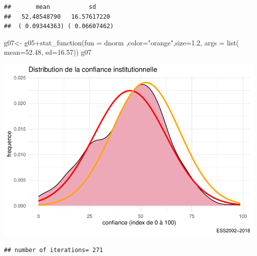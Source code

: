 \documentclass[
]{book}
\newenvironment{Shaded}{\begin{snugshade}}{\end{snugshade}}
\newcommand{\AttributeTok}[1]{\textcolor[rgb]{0.77,0.63,0.00}{#1}}
\newcommand{\DecValTok}[1]{\textcolor[rgb]{0.00,0.00,0.81}{#1}}
\newcommand{\FloatTok}[1]{\textcolor[rgb]{0.00,0.00,0.81}{#1}}
\newcommand{\FunctionTok}[1]{\textcolor[rgb]{0.00,0.00,0.00}{#1}}
\newcommand{\NormalTok}[1]{#1}
\newcommand{\OtherTok}[1]{\textcolor[rgb]{0.56,0.35,0.01}{#1}}
\newcommand{\SpecialCharTok}[1]{\textcolor[rgb]{0.00,0.00,0.00}{#1}}
\newcommand{\StringTok}[1]{\textcolor[rgb]{0.31,0.60,0.02}{#1}}
\begin{document}
\begin{verbatim}
##       mean           sd     
##   52.48548790   16.57617220 
##  ( 0.09344363) ( 0.06607462)
\end{verbatim}

\begin{Shaded}
\begin{Highlighting}[]
\NormalTok{g07}\OtherTok{\textless{}{-}}\NormalTok{ g05}\SpecialCharTok{+}\FunctionTok{stat\_function}\NormalTok{(}\AttributeTok{fun =}\NormalTok{  dnorm ,}\AttributeTok{color=}\StringTok{"orange"}\NormalTok{,}\AttributeTok{size=}\FloatTok{1.2}\NormalTok{, }\AttributeTok{args =} \FunctionTok{list}\NormalTok{( }\AttributeTok{mean=}\FloatTok{52.48}\NormalTok{,  }\AttributeTok{sd=}\FloatTok{16.57}\NormalTok{))}
\NormalTok{g07}
\end{Highlighting}
\end{Shaded}

\includegraphics{bookdown-demo_files/figure-latex/307-1.pdf}

\begin{Shaded}
\end{Shaded}

\begin{verbatim}
## number of iterations= 271
\end{verbatim}
\end{document}
